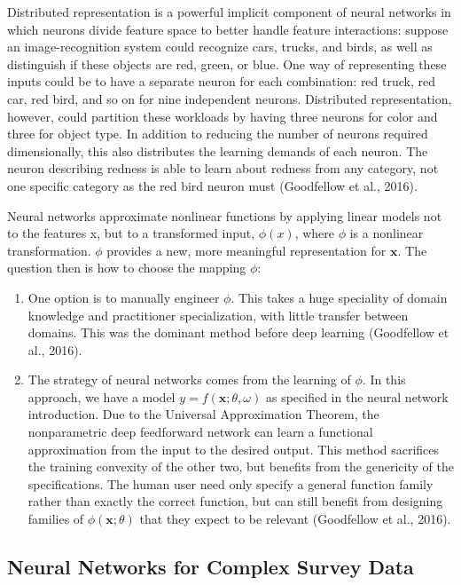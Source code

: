 \documentclass[12pt,twoside]{reedthesis}
\begin{document}
Distributed representation is a powerful implicit component of neural
networks in which neurons divide feature space to better handle feature
interactions: suppose an image-recognition system could recognize cars,
trucks, and birds, as well as distinguish if these objects are red,
green, or blue. One way of representing these inputs could be to have a
separate neuron for each combination: red truck, red car, red bird, and
so on for nine independent neurons. Distributed representation, however,
could partition these workloads by having three neurons for color and
three for object type. In addition to reducing the number of neurons
required dimensionally, this also distributes the learning demands of
each neuron. The neuron describing redness is able to learn about
redness from any category, not one specific category as the red bird
neuron must (Goodfellow et al., 2016).

Neural networks approximate nonlinear functions by applying linear
models not to the features x, but to a transformed input, \(\phi(x)\),
where \(\phi\) is a nonlinear transformation. \(\phi\) provides a new,
more meaningful representation for \(\boldsymbol{x}\). The question then
is how to choose the mapping \(\phi\):
\begin{enumerate}
\def\labelenumi{\arabic{enumi}.}
\item
  One option is to manually engineer \(\phi\). This takes a huge
  speciality of domain knowledge and practitioner specialization, with
  little transfer between domains. This was the dominant method before
  deep learning (Goodfellow et al., 2016).
\item
  The strategy of neural networks comes from the learning of \(\phi\).
  In this approach, we have a model
  \(y = f(\boldsymbol{x}; \theta, \omega)\) as specified in the neural
  network introduction. Due to the Universal Approximation Theorem, the
  nonparametric deep feedforward network can learn a functional
  approximation from the input to the desired output. This method
  sacrifices the training convexity of the other two, but benefits from
  the genericity of the specifications. The human user need only specify
  a general function family rather than exactly the correct function,
  but can still benefit from designing families of
  \(\phi(\boldsymbol{x}; \theta)\) that they expect to be relevant
  (Goodfellow et al., 2016).
\end{enumerate}
\subsection{Neural Networks for Complex Survey
Data}\label{neural-networks-for-complex-survey-data}
\end{document}
